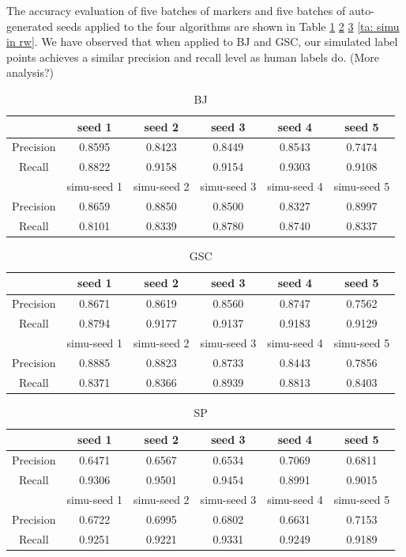 \documentclass[runningheads,a4paper]{llncs}
\begin{document}
The accuracy evaluation of five batches of markers and five batches of auto-generated seeds applied to the four algorithms are shown in Table  \ref{ta: simu in bj} \ref{ta: simu in gsc} \ref{ta: simu in sp} \ref{ta: simu in rw}. We have observed that when applied to BJ and GSC, our simulated label points achieves a similar precision and recall level as human labels do. (More analysis?)
\begin{table}
\centering
\begin{tabular}{|c|c|c|c|c|c|}
\hline
 & seed 1 & seed 2&seed 3&seed 4&seed 5 \\
\hline
Precision& 0.8595 & 0.8423 & 0.8449& 0.8543& 0.7474 \\
\hline
Recall& 0.8822 & 0.9158 & 0.9154& 0.9303& 0.9108 \\
\hline
 & simu-seed 1 & simu-seed 2&simu-seed 3&simu-seed 4&simu-seed 5 \\
 \hline
Precision& 0.8659 & 0.8850 & 0.8500& 0.8327& 0.8997 \\
\hline
Recall& 0.8101 & 0.8339 & 0.8780& 0.8740& 0.8337  \\
\hline
\end{tabular}
\caption{BJ}
\label{ta: simu in bj}
\end{table} 


\begin{table}
\centering
\begin{tabular}{|c|c|c|c|c|c|}
\hline
 & seed 1 & seed 2&seed 3&seed 4&seed 5 \\
  \hline
Precision& 0.8671 & 0.8619 & 0.8560& 0.8747& 0.7562 \\
\hline
Recall& 0.8794 & 0.9177 & 0.9137& 0.9183& 0.9129  \\
\hline
 & simu-seed 1 & simu-seed 2&simu-seed 3&simu-seed 4&simu-seed 5 \\
\hline
Precision& 0.8885 & 0.8823 & 0.8733& 0.8443& 0.7856 \\
\hline
Recall& 0.8371 & 0.8366 & 0.8939& 0.8813& 0.8403 \\
\hline
\end{tabular}
\caption{GSC}
\label{ta: simu in gsc}
\end{table} 

\begin{table}
\centering
\begin{tabular}{|c|c|c|c|c|c|}
\hline
 & seed 1 & seed 2&seed 3&seed 4&seed 5 \\
\hline
Precision& 0.6471 & 0.6567 & 0.6534& 0.7069& 0.6811 \\
\hline
Recall& 0.9306 & 0.9501 & 0.9454& 0.8991& 0.9015 \\
\hline
 & simu-seed 1 & simu-seed 2&simu-seed 3&simu-seed 4&simu-seed 5 \\
\hline
Precision& 0.6722 & 0.6995 & 0.6802& 0.6631& 0.7153 \\
\hline
Recall& 0.9251 & 0.9221 & 0.9331& 0.9249& 0.9189 \\
\hline
\end{tabular}
\caption{SP}
\label{ta: simu in sp}
\end{table} 
\end{document}

